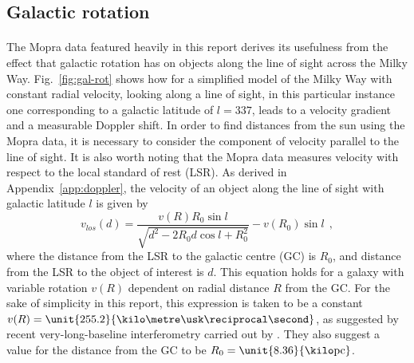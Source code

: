 \documentclass[a4paper, titlepage, oneside]{article}
\newcommand{\parsec}{\mathrm{pc}}
\begin{document}
\begin{multicols}{2}
\subsection{Galactic rotation}
\label{sec:gal-rot}
\paragraph{}
The Mopra data featured heavily in this report \parencite{Burton:2013} derives its usefulness from the effect that galactic rotation has on objects along the line of sight across the Milky Way. Fig.~\ref{fig:gal-rot} shows how for a simplified model of the Milky Way with constant radial velocity, looking along a line of sight, in this particular instance one corresponding to a galactic latitude of \(l=337\), leads to a velocity gradient and a measurable Doppler shift. In order to find distances from the sun using the Mopra data, it is necessary to consider the component of velocity parallel to the line of sight. It is also worth noting that the Mopra data measures velocity with respect to the local standard of rest (LSR). As derived in Appendix~\ref{app:doppler}, the velocity of an object along the line of sight with galactic latitude \(l\) is given by
\begin{equation}
  v_{los}(d)=\frac{v(R)R_0\sin{l}}{\sqrt{d^2-2R_0d\cos{l}+R_0^2}}-v(R_0)\sin{l}\;\,,
\end{equation}
where the distance from the LSR to the galactic centre (GC) is \(R_0\), and distance from the LSR to the object of interest is \(d\). This equation holds for a galaxy with variable rotation \(v(R)\) dependent on radial distance \(R\) from the GC. For the sake of simplicity in this report, this expression is taken to be a constant \(v(R)=\unit{255.2}{\kilo\metre\usk\reciprocal\second}\), as suggested by recent very-long-baseline interferometry carried out by \textcite{Reid:2014}. They also suggest a value for the distance from the GC to be \(R_0=\unit{8.36}{\kilo\parsec}\).


\end{multicols}
\end{document}
